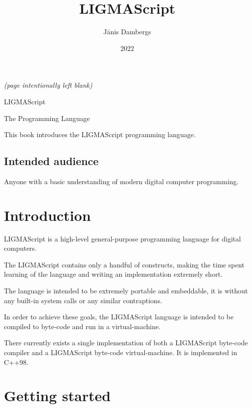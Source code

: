 \documentclass[12pt]{article}
\begin{document}
\title{LIGMAScript}
\author{Jānis Dambergs}
\date{2022}



\begin{center} \textit{(page intentionally left blank)} \end{center}

\newpage

\tableofcontents

\newpage

\begin{center} \Huge{LIGMAScript} \end{center}

\begin{center} \large{The Programming Language} \end{center}

\vspace{4em}

This book introduces the LIGMAScript programming language.

\subsection*{Intended audience}

Anyone with a basic understanding of modern digital computer programming.

\section{Introduction}

LIGMAScript is a high-level general-purpose programming language for digital computers.

The LIGMAScript contains only a handful of constructs, making the time spent learning of the language and 
writing an implementation extremely short.

The language is intended to be extremely portable and embeddable, it is without any built-in system calls 
or any similar contraptions.

In order to achieve these goals, the LIGMAScript language is intended to be compiled to byte-code and run 
in a virtual-machine. 

There currently exists a single implementation of both a LIGMAScript byte-code compiler and a LIGMAScript 
byte-code virtual-machine. It is implemented in C++98.



\section{Getting started}
\end{document}
